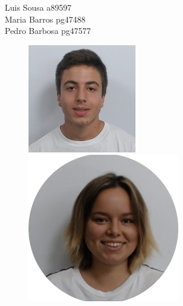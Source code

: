 \documentclass[a4paper, 11pt]{article}
\begin{document}
\begin{titlepage}
\begin{center}
       Luis Sousa a89597\\Maria Barros pg47488\\Pedro Barbosa pg47577
       \vspace{1cm}
	\begin{figure}[!htb]
	    \hspace{1.5cm}
            \includegraphics[width=\linewidth]{images/Capa/80.jpg} 
            \centering
            \captionsetup{a89597}
        \endminipage
        \hspace{-0.2cm}
            \includegraphics[width=\linewidth]{images/Capa/44.jpg} 

\end{figure}
\end{center}
\end{titlepage}
\end{document}
